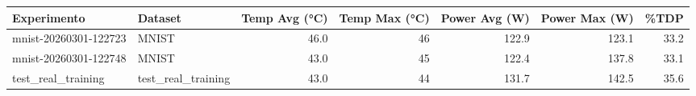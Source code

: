 \begin{tabular}{llrrrrr}
\toprule
Experimento & Dataset & Temp Avg (°C) & Temp Max (°C) & Power Avg (W) & Power Max (W) & \%TDP \\
\midrule
mnist-20260301-122723 & MNIST & 46.0 & 46 & 122.9 & 123.1 & 33.2 \\
mnist-20260301-122748 & MNIST & 43.0 & 45 & 122.4 & 137.8 & 33.1 \\
test_real_training & test_real_training & 43.0 & 44 & 131.7 & 142.5 & 35.6 \\
\bottomrule
\end{tabular}